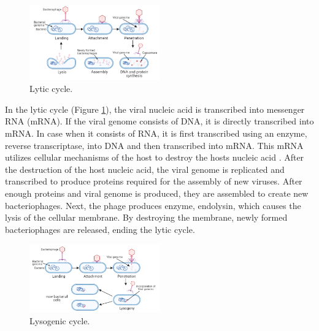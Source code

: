 \begin{figure}[h]
  \begin{center}
     \includegraphics[width=0.5\textwidth]{images/lytic.png}
     \caption{Lytic cycle.}\label{fig:lytic}
  \end{center}
\end{figure} 

In the lytic cycle (Figure \ref{fig:lytic}), the viral nucleic acid is transcribed into messenger RNA (mRNA). If the viral genome consists of DNA, it is directly transcribed into mRNA. In case when it consists of RNA, it is first transcribed using an enzyme, reverse transcriptase, into DNA and then transcribed into mRNA. This mRNA utilizes cellular mechanisms of the host to destroy the hosts nucleic acid \cite{guttman2005basic}. After the destruction of the host nucleic acid, the viral genome is replicated and transcribed to produce proteins required for the assembly of new viruses. After enough proteins and viral genome is produced, they are assembled to create new bacteriophages. Next, the phage produces enzyme, endolysin, which causes the lysis of the cellular membrane. By destroying the membrane, newly formed bacteriophages are released, ending the lytic cycle.

\begin{figure}[h]
  \begin{center}
     \includegraphics[width=0.5\textwidth]{images/lysogenic.png}
     \caption{Lysogenic cycle.}\label{fig:lysogenic}
  \end{center}
\end{figure} 

